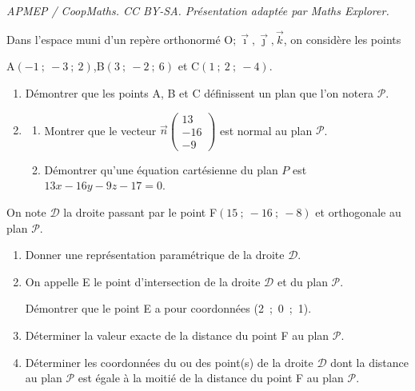 \documentclass[10pt]{article}
\providecommand{\vect}[1]{\overrightarrow{#1}}
\providecommand{\Oijk}{\(\mathrm{O};\vec{\imath},\vec{\jmath},\vec{k}\)}
\begin{document}
\noindent\textit{APMEP / CoopMaths. CC BY-SA. Présentation adaptée par Maths Explorer.}\par\medskip
\medskip

Dans l'espace muni d'un repère orthonormé \Oijk, on considère les
points
\begin{center}A$(-1~;~-3~;~2)$,\qquad B$(3~;~-2~;~6)$ \quad et \quad  C$(1~;~2~;~-4)$.\end{center}

\smallskip

\begin{enumerate}
\item Démontrer que les points A, B et C définissent un plan que l'on notera $\mathcal{P}$.
\item 
	\begin{enumerate}
		\item Montrer que le vecteur $\vect{n}\begin{pmatrix}13\\-16\\-9\end{pmatrix}$  est normal au plan $\mathcal{P}$.
		\item Démontrer qu'une équation cartésienne du plan $P$ est $13x - 16y - 9z- 17 = 0$.
	\end{enumerate}
\end{enumerate}

On note $\mathcal{D}$ la droite passant par le point F$(15~;~-16~;~-8)$ et orthogonale au plan $\mathcal{P}$.
\begin{enumerate}[resume]
\item Donner une représentation paramétrique de la droite $\mathcal{D}$.
\item On appelle E le point d'intersection de la droite $\mathcal{D}$ et du plan $\mathcal{P}$.

Démontrer que le point E a pour coordonnées (2~;~0~;~1).
\item Déterminer la valeur exacte de la distance du point F au plan $\mathcal{P}$.
\item Déterminer les coordonnées du ou des point(s) de la droite $\mathcal{D}$ dont la distance au plan $\mathcal{P}$ est égale à la moitié de la distance du point F au plan $\mathcal{P}$.
\end{enumerate}
\end{document}
